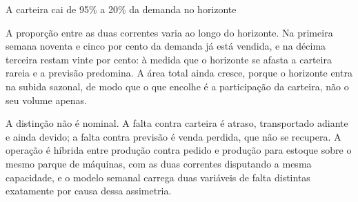 \documentclass[11pt,aspectratio=169]{beamer}
\begin{document}
\begin{frame}{A carteira cai de 95\% a 20\% da demanda no horizonte}
{  A proporção entre as duas correntes varia ao longo do horizonte. Na primeira semana noventa e
  cinco por cento da demanda já está vendida, e na décima terceira restam vinte por cento: à
  medida que o horizonte se afasta a carteira rareia e a previsão predomina. A área total ainda
  cresce, porque o horizonte entra na subida sazonal, de modo que o que encolhe é a participação
  da carteira, não o seu volume apenas.

  A distinção não é nominal. A falta contra carteira é atraso, transportado adiante e ainda
  devido; a falta contra previsão é venda perdida, que não se recupera. A operação é híbrida entre
  produção contra pedido e produção para estoque sobre o mesmo parque de máquinas, com as duas
  correntes disputando a mesma capacidade, e o modelo semanal carrega duas variáveis de falta
  distintas exatamente por causa dessa assimetria.}
\end{frame}

\end{document}
